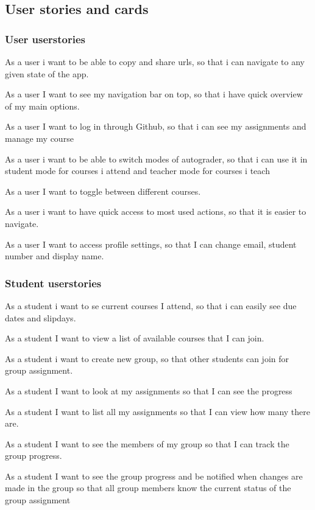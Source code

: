 \begin{appendices}
\chapter{User stories and cards}\label{ap:userstories}

\subsection*{User userstories}
\begin{itemize*}
\item As a user i want to be able to copy and share urls, so that i can navigate to any given state of the app.
\item As a user I want to see my navigation bar on top, so that i have quick overview of my main options.
\item As a user I want to log in through Github, so that i can see my assignments and manage my course
\item As a user i want to be able to switch modes of autograder, so that i can use it in student mode for courses i attend and teacher mode for courses i teach
\item As a user I want to toggle between different courses.
\item As a user i want to have quick access to most used actions, so that it is easier to navigate.
\item As a user I want to access profile settings, so that I can change email, student number and display name.

\subsection*{Student userstories}
\item As a student i want to se current courses I attend, so that i can easily see due dates and slipdays.
\item As a student I want to view a list of available courses that I can join.
\item As a student i want to create new group, so that other students can join for group assignment.
\item As a student I want to look at my assignments so that I can see the progress
\item As a student I want to list all my assignments so that I can view how many there are.
\item As a student I want to see the members of my group so that I can track the group progress.
\item As a student I want to see the group progress and be notified when changes are made in the group so that all group members know the current status of the group assignment 


\end{itemize*}
\end{appendices}
